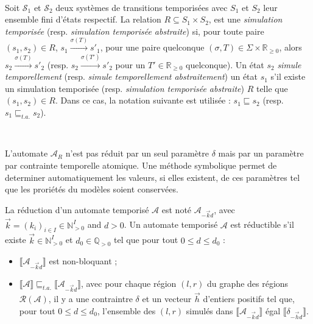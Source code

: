 \documentclass{article}
\begin{document}
      ~
      
      Soit $\mathcal{S}_1$ et $\mathcal{S}_2$ deux systèmes de transitions
      temporisées avec $S_1$ et $S_2$ leur ensemble fini d'états respectif.  La
      relation $R \subseteq S_1 \times S_2$, est une {\em simulation temporisée}
      (resp. {\em simulation temporisée abstraite}) si, pour toute paire $(s_1,
      s_2) \in R$, $s_1 \xrightarrow{\sigma(T)} s'_1$, pour une paire quelconque
      $(\sigma, T) \in \Sigma \times \mathbb{R}_{\geq 0}$, alors $s_2
      \xrightarrow{\sigma(T)} s'_2$ (resp. $s_2 \xrightarrow{\sigma(T')} s'_2$
      pour un $T' \in \mathbb{R}_{\geq 0}$ quelconque). Un état $s_2$ {\em
        simule temporellement} (resp. {\em simule temporellement abstraitement})
      un état $s_1$ s'il existe un simulation temporisée (resp. {\em simulation
        temporisée abstraite}) $R$ telle que $(s_1, s_2) \in R$. Dans ce cas, la
      notation suivante est utilisée : $s_1 \sqsubseteq s_2$ (resp. $s_1
      \sqsubseteq_{t.a.} s_2$).
      
      ~

      L'automate $\mathcal{A}_R$ n'est pas réduit par un seul paramètre $\delta$
      mais par un paramètre par contrainte temporelle atomique. Une méthode
      symbolique permet de determiner automatiquement les valeurs, si elles
      existent, de ces paramètres tel que les proriétés du modèles soient
      conservées.

      La réduction d'un automate temporisé $\mathcal{A}$ est noté
      $\mathcal{A}_{-\vec{k}d}$, avec $\vec{k} = (k_i)_{i \in I} \in
      \mathbb{N}^I_{>0}$ and $d > 0$. Un automate temporisé $\mathcal{A}$ est
      réductible s'il existe $\vec{k} \in \mathbb{N}^I_{>0}$ et $d_0 \in
      \mathbb{Q}_{>0}$ tel que pour tout $0 \leq d \leq d_0$ :
      
      \begin{itemize}
        \item $\llbracket\mathcal{A}_{-\vec{k}d}\rrbracket$ est non-bloquant ;
        \item $\llbracket\mathcal{A}\rrbracket \sqsubseteq_{t.a.}
          \llbracket\mathcal{A}_{-\vec{k}d}\rrbracket$, avec pour chaque région
          $(l,r)$ du graphe des régions $\mathcal{R}(\mathcal{A})$, il y a une
          contraintre $\delta$ et un vecteur $\vec{h}$ d'entiers positifs tel
          que, pour tout $0 \leq d \leq d_0$, l'ensemble des $(l,r)$ simulés
          dans $\llbracket\mathcal{A}_{-\vec{k}d}\rrbracket$ égal
          $\llbracket\delta_{-\vec{h}d}\rrbracket$.
      \end{itemize}
      
\end{document}
